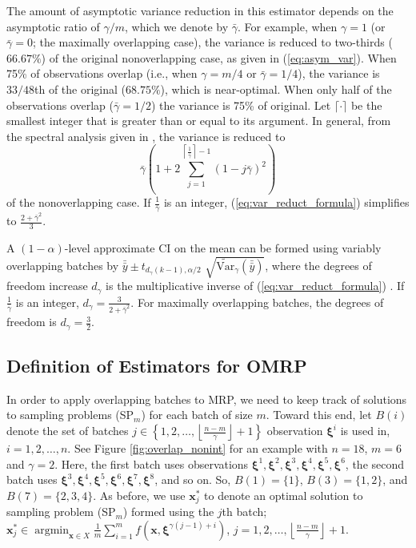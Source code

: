 \documentclass[12pt]{article}
\newcommand{\vartg}[1]{\widetilde{\mathrm{Var}}_\gamma \left( #1 \right)}
\newcommand{\x}{\mathbf{x}}
\newcommand{\xs}{\x^*}
\newcommand{\xit}{\boldsymbol{\xi}}
\newcommand{\xiti}{\xit^i}
\newcommand{\nb}{\left\lfloor\tfrac{n-m}{\gamma}\right\rfloor+1}
\newcommand{\gammab}{\bar{\gamma}}
\newcommand{\ogb}{\tfrac{1}{\gammab}}
\newcommand{\cogb}{\left\lceil\ogb\right\rceil}
\newcommand{\yb}{\bar{y}}
\newcommand{\ybb}{\bar{\yb}}
\DeclareMathOperator*{\argmin}{argmin}
\begin{document}
The amount of asymptotic variance reduction in this estimator depends on the asymptotic ratio of $\gamma/m$, which we denote by $\gammab$.  
For example, when $\gamma = 1$ (or $\gammab=0$; the maximally overlapping case), the variance is reduced to two-thirds ($66.67\%$) of the original nonoverlapping case, as given in (\ref{eq:asym_var}).  
When 75\% of observations overlap (i.e., when $\gamma = m/4$ or $\gammab = 1/4$), the variance is $33/48$th of the original ($68.75\%$), which is near-optimal.   
When only half of the observations overlap ($\gammab = 1/2$) the variance is 75\% of original.  
Let $\lceil \cdot \rceil$ be the smallest integer that is greater than or equal to its argument. 
In general, from the spectral analysis given in \citep{Welch1987}, the variance is reduced to
\begin{equation} \label{eq:var_reduct_formula}
	\gammab \left( 1 + 2 \sum_{j=1}^{\cogb-1} (1-j\gammab)^2 \right) %
\end{equation}
of the nonoverlapping case.  
If $\ogb$ is an integer, (\ref{eq:var_reduct_formula}) simplifies to $\frac{2+\gammab^2}{3}$.


A $(1-\alpha)$-level approximate CI on the mean can be formed using variably overlapping batches by $\ybb \pm t_{d_{\gamma}(k-1),\alpha/2}$ $\sqrt{\vartg{\ybb}}$, where the degrees of freedom increase $d_{\gamma}$ is the multiplicative inverse of (\ref{eq:var_reduct_formula}) \citep{Welch1987}.  
If $\ogb$ is an integer, $d_{\gamma} = \frac{3}{2+\gammab^2}$.  For maximally overlapping batches, the degrees of freedom is $d_{\gamma} = \frac{3}{2}$.
 

\subsection{Definition of Estimators for OMRP}
In order to apply overlapping batches to MRP, we need to keep track of solutions to sampling problems (SP$_m$) for each batch of size $m$.  
Toward this end, let $B(i)$ denote the set of batches $j \in \left\{1, 2, \dots, \nb \right\}$ observation $\xiti$ is used in, $i = 1, 2, \dots, n$.  
See Figure \ref{fig:overlap_nonint} for an example with $n=18$, $m = 6$ and $\gamma = 2$.  
Here, the first batch uses observations $\xit^1, \xit^2, \xit^3, \xit^4, \xit^5, \xit^6$, the second batch uses $\xit^3, \xit^4, \xit^5, \xit^6, \xit^7, \xit^8$, and so on.  
So, $B(1) = \{1\}$, $B(3) = \{1,2\}$, and $B(7)=\{2,3,4\}$.  
As before, we use $\xs_j$ to denote an optimal solution to sampling problem (SP$_m$) formed using the $j$th batch; $\xs_j \in \argmin_{\x \in X} \frac{1}{m} \sum_{i=1}^m f(\x,\xit^{\gamma(j-1) + i})$, $j = 1, 2, \dots, \nb$.
\end{document}

